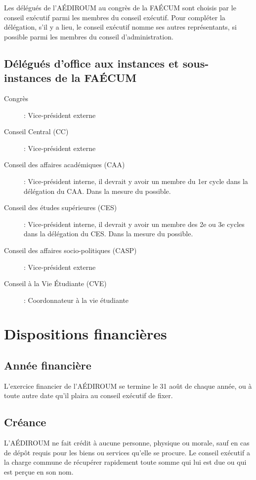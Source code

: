 \documentclass[12pt]{article}
\begin{document}
Les délégués de l'AÉDIROUM au congrès de la FAÉCUM sont choisis par le conseil exécutif parmi les membres du conseil exécutif. Pour compléter la délégation, s'il y a lieu, le conseil exécutif nomme ses autres représentants, si possible parmi les membres du conseil d'administration.

\subsection{Délégués d'office aux instances et sous-instances de la FAÉCUM}
\begin{description}
\item[Congrès] : Vice-président externe
\item[Conseil Central (CC)] : Vice-président externe
\item[Conseil des affaires académiques (CAA)] : Vice-président interne, il devrait y avoir un membre du 1er cycle dans la délégation du CAA. Dans la mesure du possible.
\item[Conseil des études supérieures (CES)] : Vice-président interne, il devrait y avoir un membre des 2e ou 3e cycles dans la délégation du CES. Dans la mesure du possible.
\item[Conseil des affaires socio-politiques (CASP)] : Vice-président externe
\item[Conseil à la Vie Étudiante (CVE)] : Coordonnateur à la vie étudiante
\end{description}

\section{Dispositions financières}
\subsection{Année financière}

L'exercice financier de l'AÉDIROUM se termine le 31 août de chaque année, ou à toute autre date qu'il plaira au conseil exécutif de fixer.

\subsection{Créance}

L'AÉDIROUM ne fait crédit à aucune personne, physique ou morale, sauf en cas de dépôt requis pour les biens ou services qu'elle se procure. Le conseil exécutif a la charge commune de récupérer rapidement toute somme qui lui est due ou qui est perçue en son nom.
\end{document}
